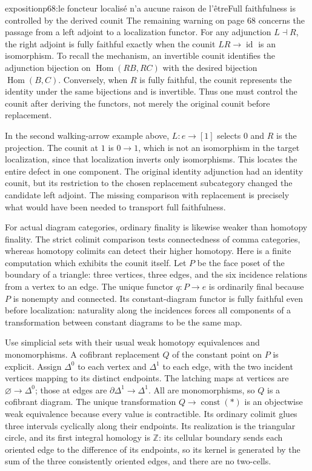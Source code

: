 \begin{dcomment}{exposition}{p68:le foncteur localisé n'a aucune raison de l'être}{Full faithfulness is controlled by the derived counit}
The remaining warning on page 68 concerns the passage from a left adjoint to a localization functor. For any adjunction $L\dashv R$, the right adjoint is fully faithful exactly when the counit $LR\to\operatorname{id}$ is an isomorphism. To recall the mechanism, an invertible counit identifies the adjunction bijection on $\operatorname{Hom}(RB,RC)$ with the desired bijection $\operatorname{Hom}(B,C)$. Conversely, when $R$ is fully faithful, the counit represents the identity under the same bijections and is invertible. Thus one must control the counit after deriving the functors, not merely the original counit before replacement.

In the second walking-arrow example above, $L:e\to[1]$ selects $0$ and $R$ is the projection. The counit at $1$ is $0\to1$, which is not an isomorphism in the target localization, since that localization inverts only isomorphisms. This locates the entire defect in one component. The original identity adjunction had an identity counit, but its restriction to the chosen replacement subcategory changed the candidate left adjoint. The missing comparison with replacement is precisely what would have been needed to transport full faithfulness.

For actual diagram categories, ordinary finality is likewise weaker than homotopy finality. The strict colimit comparison tests connectedness of comma categories, whereas homotopy colimits can detect their higher homotopy. Here is a finite computation which exhibits the counit itself. Let $P$ be the face poset of the boundary of a triangle: three vertices, three edges, and the six incidence relations from a vertex to an edge. The unique functor $q:P\to e$ is ordinarily final because $P$ is nonempty and connected. Its constant-diagram functor is fully faithful even before localization: naturality along the incidences forces all components of a transformation between constant diagrams to be the same map.

Use simplicial sets with their usual weak homotopy equivalences and monomorphisms. A cofibrant replacement $Q$ of the constant point on $P$ is explicit. Assign $\Delta^0$ to each vertex and $\Delta^1$ to each edge, with the two incident vertices mapping to its distinct endpoints. The latching maps at vertices are $\varnothing\to\Delta^0$; those at edges are $\partial\Delta^1\to\Delta^1$. All are monomorphisms, so $Q$ is a cofibrant diagram. The unique transformation $Q\to\operatorname{const}(*)$ is an objectwise weak equivalence because every value is contractible. Its ordinary colimit glues three intervals cyclically along their endpoints. Its realization is the triangular circle, and its first integral homology is $\mathbb Z$: its cellular boundary sends each oriented edge to the difference of its endpoints, so its kernel is generated by the sum of the three consistently oriented edges, and there are no two-cells.


\end{dcomment}

